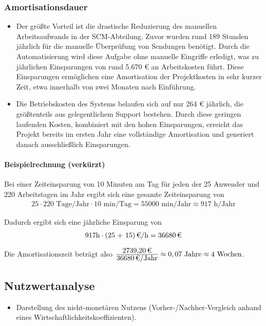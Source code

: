 \subsubsection{Amortisationsdauer}
\label{sec:Amortisationsdauer}
\begin{itemize}
	\item Der größte Vorteil ist die drastische Reduzierung des manuellen Arbeitsaufwands in der SCM-Abteilung. Zuvor wurden rund 189 Stunden jährlich für die manuelle Überprüfung von Sendungen benötigt. Durch die Automatisierung wird diese Aufgabe ohne manuelle Eingriffe erledigt, was zu jährlichen Einsparungen von rund 5.670 € an Arbeitskosten führt. Diese Einsparungen ermöglichen eine Amortisation der Projektkosten in sehr kurzer Zeit, etwa innerhalb von zwei Monaten nach Einführung.
	\item Die Betriebskosten des Systems belaufen sich auf nur 264 € jährlich, die größtenteils aus gelegentlichem Support bestehen. Durch diese geringen laufenden Kosten, kombiniert mit den hohen Einsparungen, erreicht das Projekt bereits im ersten Jahr eine vollständige Amortisation und generiert danach ausschließlich Einsparungen.
\end{itemize}

\paragraph{Beispielrechnung (verkürzt)}
Bei einer Zeiteinsparung von 10 Minuten am Tag für jeden der 25 Anwender und 220 Arbeitstagen im Jahr ergibt sich eine gesamte Zeiteinsparung von 
\begin{eqnarray}
25 \cdot 220 \mbox{ Tage/Jahr} \cdot 10 \mbox{ min/Tag} = 55000 \mbox{ min/Jahr} \approx 917 \mbox{ h/Jahr} 
\end{eqnarray}

Dadurch ergibt sich eine jährliche Einsparung von 
\begin{eqnarray}
917 \mbox{h} \cdot \eur{(25 + 15)}{\mbox{/h}} = \eur{36680}
\end{eqnarray}

Die Amortisationszeit beträgt also $\frac{\eur{2739,20}}{\eur{36680}\mbox{/Jahr}} \approx 0,07 \mbox{ Jahre} \approx 4 \mbox{ Wochen}$.


\subsection{Nutzwertanalyse}
\label{sec:Nutzwertanalyse}
\begin{itemize}
	\item Darstellung des nicht-monetären Nutzens (\zB Vorher-/Nachher-Vergleich anhand eines Wirtschaftlichkeitskoeffizienten). 
\end{itemize}

